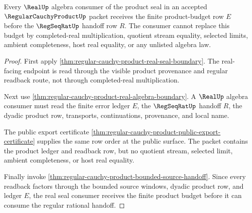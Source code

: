 \begin{theorem}
\label{thm:regular-cauchy-product-real-seal-product-budget}
Every $\RealUp$ algebra consumer of the product seal in an accepted
$\RegularCauchyProductUp$ packet receives the finite product-budget row $E$
before the $\RegSeqRatUp$ handoff row $R$. The consumer cannot replace this
budget by completed-real multiplication, quotient stream equality, selected
limits, ambient completeness, host real equality, or any unlisted algebra law.
\end{theorem}
\begin{proof}
First apply \autoref{thm:regular-cauchy-product-real-seal-boundary}. The
real-facing endpoint is read through the visible product provenance and
regular readback route, not through completed-real multiplication.

Next use \autoref{thm:regular-cauchy-product-real-algebra-boundary}. A
$\RealUp$ algebra consumer must read the finite error ledger $E$, the
$\RegSeqRatUp$ handoff $R$, the dyadic product row, transports, continuations,
provenance, and local name.

The public export certificate
\autoref{thm:regular-cauchy-product-public-export-certificate} supplies the
same row order at the public surface. The packet contains the product ledger
and readback row, but no quotient stream, selected limit, ambient
completeness, or host real equality.

Finally invoke
\autoref{thm:regular-cauchy-product-bounded-source-handoff}. Since every
readback factors through the bounded source windows, dyadic product row, and
ledger $E$, the real seal consumer receives the finite product budget before
it can consume the regular rational handoff.
\end{proof}

